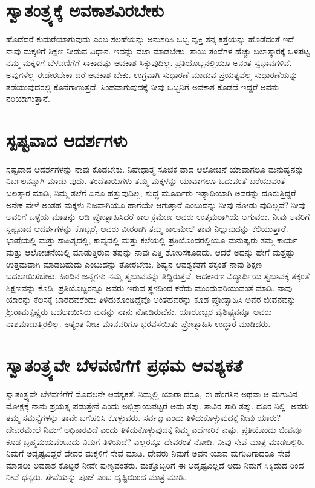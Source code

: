 \section{ಸ್ವಾತಂತ್ರ್ಯಕ್ಕೆ ಅವಕಾಶವಿರಬೇಕು}

ಹೊಡೆದರೆ ಕುದುರೆಯಾಗುವುದು ಎಂಬ ಸಲಹೆಯನ್ನು ಅನುಸರಿಸಿ ಒಬ್ಬ ವ್ಯಕ್ತಿ ತನ್ನ ಕತ್ತೆಯನ್ನು ಹೊಡೆದಂತೆ ಇದೆ ನಾವು ಮಕ್ಕಳಿಗೆ ಶಿಕ್ಷಣ ನೀಡುವ ವಿಧಾನ. ಇದನ್ನು ವಜಾ ಮಾಡಬೇಕು. ತಾಯಿ ತಂದೆಗಳ ಹೆಚ್ಚು ಬಲಾತ್ಕಾರಕ್ಕೆ ಒಳಪಟ್ಟ ನಮ್ಮ ಮಕ್ಕಳಿಗೆ ಬೆಳವಣಿಗೆಗೆ ಸಾಕಾದಷ್ಟು ಅವಕಾಶ ಸಿಕ್ಕುವುದಿಲ್ಲ. ಪ್ರತಿಯೊಬ್ಬನಲ್ಲಿಯೂ ಅನಂತ ಸ್ವಭಾವಗಳಿವೆ. ಅವುಗಳೆಲ್ಲ ಈಡೇರಬೇಕಾ ದರೆ ಅವಕಾಶ ಬೇಕು. ಉಗ್ರವಾಗಿ ಸುಧಾರಣೆ ಮಾಡುವ ಪ್ರಯತ್ನವೆಲ್ಲ ಸುಧಾರಣೆಯನ್ನು ತಡೆಯುವುದರಲ್ಲಿ ಕೊನೆಗಾಣುತ್ತದೆ. ಸಿಂಹವಾಗುವುದಕ್ಕೆ ನೀವು ಒಬ್ಬನಿಗೆ ಅವಕಾಶ ಕೊಡದೆ ಇದ್ದರೆ ಅವನು ನರಿಯಾಗುತ್ತಾನೆ.


\section{ಸ್ಪಷ್ಟವಾದ ಆದರ್ಶಗಳು}

ಸ್ಪಷ್ಟವಾದ ಆದರ್ಶಗಳನ್ನು ನಾವು ಕೊಡಬೇಕು. ನಿಷೇಧಾತ್ಮ ಸೂಚಕ ವಾದ ಆಲೋಚನೆ ಯಾವಾಗಲೂ ಮನುಷ್ಯನನ್ನು ನಿರ್ಬಲನನ್ನಾಗಿ ಮಾಡು ವುದು. ತಂದೆತಾಯಿಗಳು ತಮ್ಮ ಮಕ್ಕಳನ್ನು ಯಾವಾಗಲೂ ಓದುವಂತೆ ಬರೆಯುವಂತೆ ಬಲತ್ಕಾರ ಮಾಡಿ, ನಿಮ್ಮ ತಲೆಗೆ ಏನೂ ಹತ್ತುವುದಿಲ್ಲ; ಶುದ್ಧ ಮೂರ್ಖರು ಇತ್ಯಾದಿಯಾಗಿ ಅವರನ್ನು ದೂರುತ್ತಿದ್ದರೆ ಅನೇಕ ವೇಳೆ ಅಂತಹ ಮಕ್ಕಳು ನಿಜವಾಗಿಯೂ ಹಾಗೆಯೇ ಆಗುತ್ತಾರೆ ಎಂಬುದನ್ನು ನೀವು ನೋಡು ವುದಿಲ್ಲವೆ? ನೀವು ಅವರಿಗೆ ಒಳ್ಳೆಯ ಮಾತನ್ನು ಆಡಿ ಪ್ರೋತ್ಸಾಹಿಸಿದರೆ ಕಾಲ ಕ್ರಮೇಣ ಅವರು ಉತ್ತಮರಾಗಿಯೆ ಆಗುವರು. ನೀವು ಅವರಿಗೆ ಸ್ಪಷ್ಟವಾದ ಆದರ್ಶಗಳನ್ನು ಕೊಟ್ಟರೆ, ಅವರು ವೀರರಾಗಿ ತಮ್ಮ ಕಾಲಮೇಲೆ ತಾವು ನಿಲ್ಲುವುದನ್ನು ಕಲಿಯುತ್ತಾರೆ. ಭಾಷೆಯಲ್ಲಿ ಮತ್ತು ಸಾಹಿತ್ಯದಲ್ಲಿ, ಕಾವ್ಯದಲ್ಲಿ ಮತ್ತು ಕಲೆಯಲ್ಲಿ ಪ್ರತಿಯೊಂದರಲ್ಲಿಯೂ ಮನುಷ್ಯರು ತಮ್ಮ ಕಾರ್ಯ ಮತ್ತು ಆಲೋಚನೆಯಲ್ಲಿ ಮಾಡುತ್ತಿರುವ ತಪ್ಪನ್ನು ನಾವು ಎತ್ತಿ ತೋರಿಸಕೂಡದು. ಆದರೆ ಅದನ್ನು ಹೇಗೆ ಮತ್ತಷ್ಟು ಉತ್ತಮವಾಗಿ ಮಾಡಬಹುದು ಎಂಬುದನ್ನು ತೋರಬೇಕು. ಶಿಷ್ಯನ ಆವಶ್ಯಕತೆಗೆ ತಕ್ಕಂತೆ ನಾವು ಶಿಕ್ಷಣ ಬದಲಾಯಿಸಬೇಕು. ಹಿಂದಿನ ಜನ್ಮಗಳು ನಮ್ಮ ಸ್ವಭಾವವನ್ನು ತಿದ್ದಿರುತ್ತವೆ. ಆದಕಾರಣ ವಿದ್ಯಾರ್ಥಿಯ ಸ್ವಭಾವಕ್ಕೆ ತಕ್ಕಂತೆ ಶಿಕ್ಷಣವನ್ನು ಕೊಡಿ. ಪ್ರತಿಯೊಬ್ಬರನ್ನೂ ಅವರು ಇರುವ ಸ್ಥಳದಿಂದ ಕರೆದು ಮುಂದುವರಿಯುವಂತೆ ಮಾಡಿ. ನಾವು ಯಾರನ್ನು ಕೆಲಸಕ್ಕೆ ಬಾರದವರೆಂದು ತಿಳಿದುಕೊಂಡಿದ್ದೆವೊ ಅಂತಹವರನ್ನು ಕೂಡ ಪ್ರೋತ್ಸಾಹಿಸಿ ಅವರ ಜೀವನವನ್ನು ಶ್ರೀರಾಮಕೃಷ್ಣರು ಬದಲಾಯಿಸಿರು ವುದನ್ನು ನಾನು ನೋಡಿರುವೆನು. ಯಾರೊಬ್ಬರ ವೈಶಿಷ್ಟ್ಯವನ್ನೂ ಅವರು ನಾಶಮಾಡುತ್ತಿರಲಿಲ್ಲ. ಅತ್ಯಂತ ನೀಚ ಮಾನವರಿಗೂ ಭರವಸೆಯಿತ್ತು ಪ್ರೋತ್ಸಾಹಿಸಿ ಉದ್ಧಾರ ಮಾಡಿದರು.


\section{ಸ್ವಾತಂತ್ರ್ಯವೇ ಬೆಳವಣಿಗೆಗೆ ಪ್ರಥಮ ಆವಶ್ಯಕತೆ}

ಸ್ವಾತಂತ್ರ್ಯವೇ ಬೆಳವಣಿಗೆಗೆ ಮೊದಲನೇ ಆವಶ್ಯಕತೆ. ನಿಮ್ಮಲ್ಲಿ ಯಾರಾ ದರೂ, ಈ ಹೆಂಗಸಿನ ಅಥವಾ ಆ ಮಗುವಿನ ಮೋಕ್ಷಕ್ಕೆ ನಾನು ಪ್ರಯತ್ನ ಪಡುತ್ತೇನೆ ಎಂದು ಅಭಿಪ್ರಾಯಪಟ್ಟರೆ ಅದು ತಪ್ಪು. ಸಾವಿರ ಸಾರಿ ತಪ್ಪು. ದೂರ ನಿಲ್ಲಿ. ಅವರು ತಮ್ಮ ಸಮಸ್ಯೆಗಳನ್ನು ತಾವೇ ಬಗೆಹರಿಸಿ ಕೊಳ್ಳುವರು. ಸರ್ವಜ್ಞ ಎಂದು ತಿಳಿದುಕೊಳ್ಳುವುದಕ್ಕೆ ನೀವು ಯಾರು? ದೇವರಮೇಲೆ ನಿಮಗೆ ಅಧಿಕಾರವಿದೆ ಎಂದು ತಿಳಿದುಕೊಳ್ಳುವುದಕ್ಕೆ ನಿಮ್ಮ ಎದೆಗಾರಿಕೆ ಎಷ್ಟು. ಪ್ರತಿಯೊಂದು ಜೀವವೂ ಕೂಡ ಬ್ರಹ್ಮಮಯವೆಂಬುದು ನಿಮಗೆ ತಿಳಿಯದೆ? ಎಲ್ಲರನ್ನೂ ದೇವರಂತೆ ನೋಡಿ. ನೀವು ಸೇವೆ ಮಾತ್ರ ಮಾಡಬಲ್ಲಿರಿ. ನಿಮಗೆ ಅದೃಷ್ಟವಿದ್ದರೆ ದೇವರ ಮಕ್ಕಳಿಗೆ ಸೇವೆ ಮಾಡಿ. ದೇವರು ನಿಮಗೆ ಅವನ ಯಾವ ಮಗುವಿಗಾದರೂ ಸೇವೆ ಮಾಡಲು ಅವಕಾಶ ಕೊಟ್ಟರೆ ನೀವೇ ಪುಣ್ಯವಂತರು. ಮತ್ತೊಬ್ಬರಿಗೆ ಈ ಅದೃಷ್ಟವಿಲ್ಲದೆ ಅದು ನಿಮಗೆ ಸಿಕ್ಕಿದುದ ರಿಂದ ನೀವೆ ಧನ್ಯರು. ಸೇವೆಯನ್ನು ಪೂಜೆ ಎಂಬ ದೃಷ್ಟಿಯಿಂದ ಮಾತ್ರ ಮಾಡಿ.

